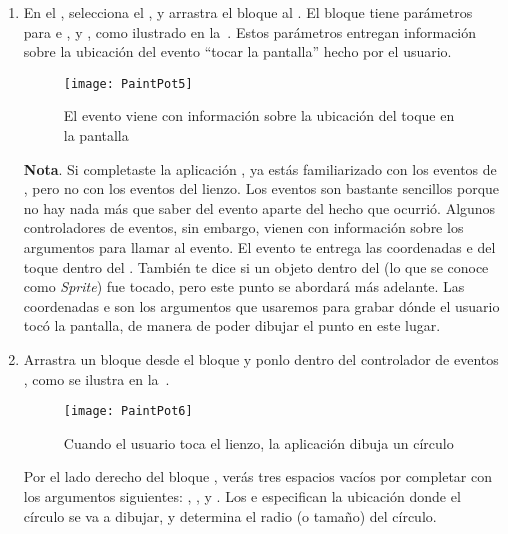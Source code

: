 \begin{enumerate}

\item En el \blockEditor, selecciona el , y
  arrastra el bloque  al \viewer. El
  bloque tiene parámetros para  e ,
  y , como ilustrado en
  la~. Estos parámetros entregan información sobre
  la ubicación del evento ``tocar la pantalla'' hecho por el usuario.

\begin{figure}[H]
\centering
\texttt{[image: PaintPot5]}
\caption{El evento viene con información sobre la ubicación del toque
  en la pantalla}
\label{fig:PaintPot5}
\end{figure}

\textbf{Nota}. Si completaste la aplicación , ya
estás familiarizado con los eventos de , pero no
con los eventos del lienzo. Los eventos  son
bastante sencillos porque no hay nada más que saber del evento aparte
del hecho que ocurrió. Algunos controladores de eventos, sin embargo,
vienen con información sobre los argumentos para llamar al evento. El
evento  te entrega las
coordenadas  e  del toque dentro del
. También te dice si un objeto dentro del
 (lo que se conoce como \emph{Sprite}) fue
tocado, pero este punto se abordará más adelante. Las
coordenadas  e  son los argumentos que
usaremos para grabar dónde el usuario tocó la pantalla, de manera de
poder dibujar el punto en este lugar.

\item Arrastra un bloque  desde
  el bloque y ponlo dentro del controlador de eventos
  , como se ilustra en
  la~.

\begin{figure}[H]
\centering
\texttt{[image: PaintPot6]}
\caption{Cuando el usuario toca el lienzo, la aplicación dibuja un círculo}
\label{fig:PaintPot6}
\end{figure}

Por el lado derecho del bloque
, verás tres espacios vacíos
por completar con los argumentos
siguientes: , ,
y . Los  e  especifican la
ubicación donde el círculo se va a dibujar, y  determina
el radio (o tamaño) del círculo.


\end{enumerate}
